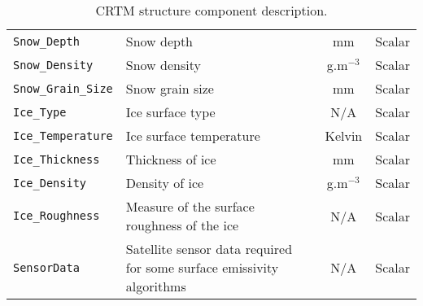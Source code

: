 \begin{table}[htp]
\begin{tabular}{|l|p{7cm}|c|c|}
    \texttt{Snow\_Depth}       & Snow depth & mm & Scalar \\ 
    \texttt{Snow\_Density}     & Snow density & g.m$^{-3}$ & Scalar \\ 
    \texttt{Snow\_Grain\_Size} & Snow grain size & mm & Scalar \\ 
    \hline
    \texttt{Ice\_Type}        & Ice surface type & N/A & Scalar \\ 
    \texttt{Ice\_Temperature} & Ice surface temperature & Kelvin & Scalar \\ 
    \texttt{Ice\_Thickness}   & Thickness of ice & mm & Scalar \\ 
    \texttt{Ice\_Density}     & Density of ice & g.m$^{-3}$ & Scalar \\ 
    \texttt{Ice\_Roughness}   & Measure of the surface roughness of the ice & N/A & Scalar \\ 
    \hline
    \texttt{SensorData} & Satellite sensor data required for some surface emissivity algorithms & N/A & Scalar \\ 
    \hline
  \end{tabular}
  \caption{CRTM \Surface{} structure component description.}
  \label{tav:surface_structure}
\end{table}

